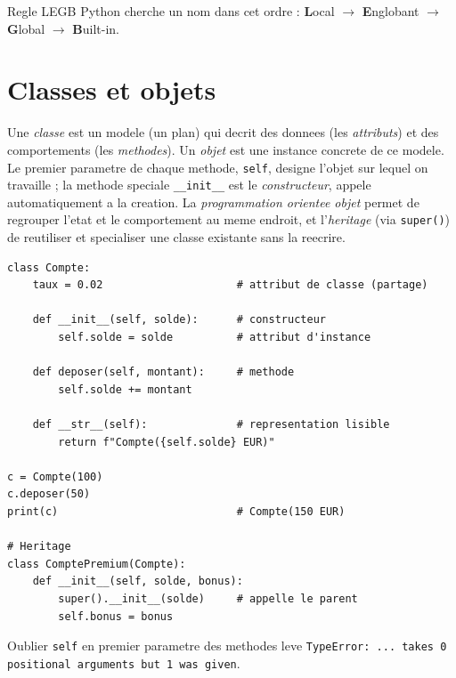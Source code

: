 \documentclass[11pt,a4paper]{article}
\begin{document}
\begin{infobox}{Regle LEGB}
Python cherche un nom dans cet ordre : \textbf{L}ocal $\rightarrow$
\textbf{E}nglobant $\rightarrow$ \textbf{G}lobal $\rightarrow$ \textbf{B}uilt-in.
\end{infobox}

\section{Classes et objets}
Une \emph{classe} est un modele (un plan) qui decrit des donnees (les
\emph{attributs}) et des comportements (les \emph{methodes}). Un \emph{objet} est
une instance concrete de ce modele. Le premier parametre de chaque methode,
\texttt{self}, designe l'objet sur lequel on travaille ; la methode speciale
\texttt{\_\_init\_\_} est le \emph{constructeur}, appele automatiquement a la
creation. La \emph{programmation orientee objet} permet de regrouper l'etat et le
comportement au meme endroit, et l'\emph{heritage} (via \texttt{super()}) de
reutiliser et specialiser une classe existante sans la reecrire.

\begin{lstlisting}
class Compte:
    taux = 0.02                     # attribut de classe (partage)

    def __init__(self, solde):      # constructeur
        self.solde = solde          # attribut d'instance

    def deposer(self, montant):     # methode
        self.solde += montant

    def __str__(self):              # representation lisible
        return f"Compte({self.solde} EUR)"

c = Compte(100)
c.deposer(50)
print(c)                            # Compte(150 EUR)

# Heritage
class ComptePremium(Compte):
    def __init__(self, solde, bonus):
        super().__init__(solde)     # appelle le parent
        self.bonus = bonus
\end{lstlisting}

\begin{piege}
Oublier \texttt{self} en premier parametre des methodes leve
\texttt{TypeError: ... takes 0 positional arguments but 1 was given}.
\end{piege}

\end{document}

